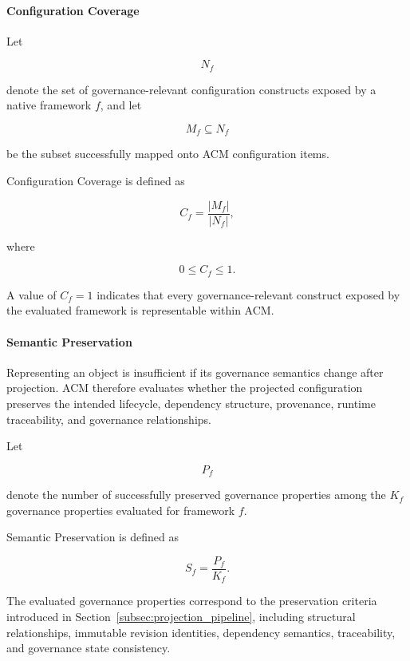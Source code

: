 \documentclass[10pt]{article}
\begin{document}
\paragraph{Configuration Coverage}

Let

\[
N_f
\]

denote the set of governance-relevant configuration constructs exposed by a
native framework \(f\), and let

\[
M_f \subseteq N_f
\]

be the subset successfully mapped onto ACM configuration items.

Configuration Coverage is defined as

\begin{equation}
	C_f =
	\frac{|M_f|}
	{|N_f|},
	\label{eq:coverage}
\end{equation}

where

\[
0 \le C_f \le 1.
\]

A value of \(C_f=1\) indicates that every governance-relevant construct exposed
by the evaluated framework is representable within ACM.

\paragraph{Semantic Preservation}

Representing an object is insufficient if its governance semantics change after
projection. ACM therefore evaluates whether the projected configuration
preserves the intended lifecycle, dependency structure, provenance, runtime
traceability, and governance relationships.

Let

\[
P_f
\]

denote the number of successfully preserved governance properties among the
\(K_f\) governance properties evaluated for framework \(f\).

Semantic Preservation is defined as

\begin{equation}
	S_f =
	\frac{P_f}
	{K_f}.
	\label{eq:semantic_preservation}
\end{equation}

The evaluated governance properties correspond to the preservation criteria
introduced in Section~\ref{subsec:projection_pipeline}, including structural
relationships, immutable revision identities, dependency semantics,
traceability, and governance state consistency.
\end{document}
